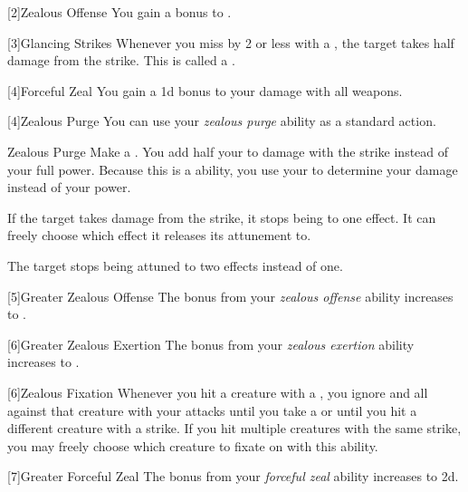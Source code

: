         [2]{Zealous Offense} You gain a  bonus to .

        [3]{Glancing Strikes} Whenever you miss by 2 or less with a , the target takes half damage from the strike.
        This is called a .

        [4]{Forceful Zeal} You gain a \plus1d bonus to your damage with all weapons.

        [4]{Zealous Purge} You can use your \textit{zealous purge} ability as a standard action.
        \begin{instantability}{Zealous Purge}
            \rankline
            Make a .
            You add half your  to damage with the strike instead of your full power.
            Because this is a  ability, you use your   to determine your damage instead of your  power.

            If the target takes damage from the strike, it stops being  to one effect.
            It can freely choose which effect it releases its attunement to.

            \rankline
             The target stops being attuned to two effects instead of one.
        \end{instantability}

        [5]{Greater Zealous Offense} The bonus from your \textit{zealous offense} ability increases to .

        [6]{Greater Zealous Exertion} The bonus from your \textit{zealous exertion} ability increases to .

        [6]{Zealous Fixation} Whenever you hit a creature with a , you ignore  and all  against that creature with your attacks until you take a  or until you hit a different creature with a strike.
        If you hit multiple creatures with the same strike, you may freely choose which creature to fixate on with this ability.

        [7]{Greater Forceful Zeal} The bonus from your \textit{forceful zeal} ability increases to \plus2d.

